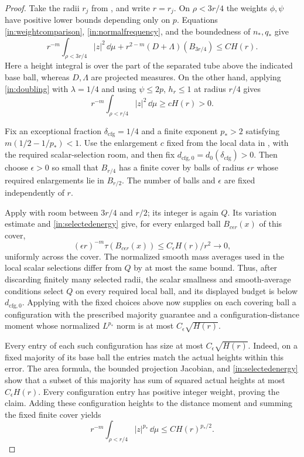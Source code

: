 \begin{proof}
Take the radii $r_j$ from , and write $r=r_j$.
On $\rho<3r/4$ the weights $\phi,\psi$ have positive lower bounds
depending only on $p$.  Equations \eqref{in:weightcomparison},
\eqref{in:normalfrequency}, and the boundedness of $n_*,q_*$ give
\begin{equation}\label{in:selectedenergy}
 r^{-m}\int_{\rho<3r/4}|z|^2\,\dd\mu
       +r^{2-m}(D+\Lambda)(B_{3r/4})\leq CH(r).
\end{equation}
Here a height integral is over the part of the separated tube above
the indicated base ball, whereas $D,\Lambda$ are projected measures.
On the other hand, applying \eqref{in:doubling} with $\lambda=1/4$
and using $\psi\leq2p$, $h_r\leq1$ at radius $r/4$ gives
\begin{equation}\label{in:heightlower}
 r^{-m}\int_{\rho<r/4}|z|^2\,\dd\mu\geq cH(r)>0.
\end{equation}

Fix an exceptional fraction $\delta_{\mathrm{cfg}}=1/4$ and a finite
exponent $p_*>2$ satisfying $m(1/2-1/p_*)<1$.  Use the enlargement $c$
fixed from the local data in , with the required
scalar-selection room, and then fix
$d_{\mathrm{cfg},0}=d_0(\delta_{\mathrm{cfg}})>0$.  Then choose
$\epsilon>0$ so small that $B_{r/4}$ has a finite cover by balls of
radius $\epsilon r$ whose required enlargements lie in $B_{r/2}$.
The number of balls and $\epsilon$ are fixed independently of $r$.

Apply  with room between $3r/4$ and $r/2$; its
integer is again $Q$.  Its variation estimate and
\eqref{in:selectedenergy} give, for every enlarged ball
$B_{c\epsilon r}(x)$ of this cover,
\[
 (\epsilon r)^{-m}\tau(B_{c\epsilon r}(x))
       \leq C_\epsilon H(r)/r^2\longrightarrow0,
\]
uniformly across the cover.  The normalized smooth mass averages
used in the local scalar selections differ from $Q$ by at most the
same bound.  Thus, after discarding finitely many selected radii, the
scalar smallness and smooth-average conditions select $Q$ on every
required local ball, and its displayed budget is below
$d_{\mathrm{cfg},0}$.  Applying  with the fixed
choices above now supplies on each covering ball a configuration with
the prescribed majority guarantee and a configuration-distance moment
whose normalized $L^{p_*}$ norm is at most $C_\epsilon\sqrt{H(r)}$.

Every entry of each such configuration has size at most
$C_\epsilon\sqrt{H(r)}$.  Indeed, on a fixed majority of its base
ball the entries match the actual heights within this error.  The
area formula, the bounded projection Jacobian, and
\eqref{in:selectedenergy} show that a subset of this majority has
sum of squared actual heights at most $C_\epsilon H(r)$.  Every
configuration entry has positive integer weight, proving the claim.
Adding these configuration heights to the distance moment and
summing the fixed finite cover yields
\begin{equation}\label{in:highermoment}
 r^{-m}\int_{\rho<r/4}|z|^{p_*}\,\dd\mu
                         \leq CH(r)^{p_*/2}.
\end{equation}


\end{proof}
